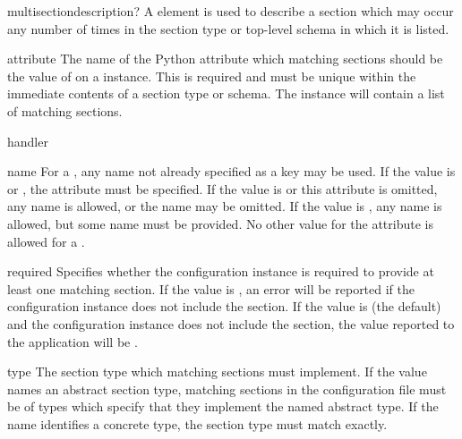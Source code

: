\documentclass{howto}
\newcommand{\datatype}[1]{\strong{#1}}
\begin{document}
\begin{elementdesc}{multisection}{description?}
  A  element is used to describe a section which
  may occur any number of times in the section type or top-level
  schema in which it is listed.

  \begin{attributedesc}{attribute}{\datatype{identifier}}
    The name of the Python attribute which matching sections should be
    the value of on a  instance.  This is required
    and must be unique within the immediate contents of a section type
    or schema.  The  instance will contain a list
    of matching sections.
  \end{attributedesc}

  \begin{attributedesc}{handler}{\datatype{basic-key}}
  \end{attributedesc}

  \begin{attributedesc}{name}{\datatype{basic-key}}
    For a , any name not already specified as a
    key may be used.  If the value is \code{*} or \code{+}, the
     attribute must be specified.  If the value
    is \code{*} or this attribute is omitted, any name is allowed, or
    the name may be omitted.  If the value is \code{+}, any name is
    allowed, but some name must be provided.  No other value for the
     attribute is allowed for a
    .
  \end{attributedesc}

  \begin{attributedesc}{required}{}
    Specifies whether the configuration instance is required to
    provide at least one matching section.  If the value is
    , an error will be reported if the configuration
    instance does not include the section.  If the value is 
    (the default) and the configuration instance does not include the
    section, the value reported to the application will be
    .
  \end{attributedesc}

  \begin{attributedesc}{type}{\datatype{basic-key}}
    The section type which matching sections must implement.  If the
    value names an abstract section type, matching sections in the
    configuration file must be of types which specify that they
    implement the named abstract type.  If the name identifies a
    concrete type, the section type must match exactly.
  \end{attributedesc}
\end{elementdesc}
\end{document}
